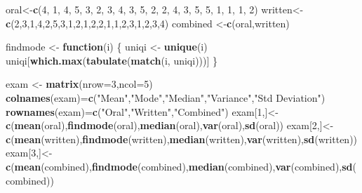\documentclass[]{article}
\newenvironment{Shaded}{\begin{snugshade}}{\end{snugshade}}
\newcommand{\KeywordTok}[1]{\textcolor[rgb]{0.13,0.29,0.53}{\textbf{#1}}}
\newcommand{\DataTypeTok}[1]{\textcolor[rgb]{0.13,0.29,0.53}{#1}}
\newcommand{\DecValTok}[1]{\textcolor[rgb]{0.00,0.00,0.81}{#1}}
\newcommand{\StringTok}[1]{\textcolor[rgb]{0.31,0.60,0.02}{#1}}
\newcommand{\ControlFlowTok}[1]{\textcolor[rgb]{0.13,0.29,0.53}{\textbf{#1}}}
\newcommand{\NormalTok}[1]{#1}
\begin{document}
\begin{Shaded}
\begin{Highlighting}[]
\NormalTok{oral<-}\KeywordTok{c}\NormalTok{(}\DecValTok{4}\NormalTok{, }\DecValTok{1}\NormalTok{, }\DecValTok{4}\NormalTok{, }\DecValTok{5}\NormalTok{, }\DecValTok{3}\NormalTok{, }\DecValTok{2}\NormalTok{, }\DecValTok{3}\NormalTok{, }\DecValTok{4}\NormalTok{, }\DecValTok{3}\NormalTok{, }\DecValTok{5}\NormalTok{, }\DecValTok{2}\NormalTok{, }\DecValTok{2}\NormalTok{, }\DecValTok{4}\NormalTok{, }\DecValTok{3}\NormalTok{, }\DecValTok{5}\NormalTok{, }\DecValTok{5}\NormalTok{, }\DecValTok{1}\NormalTok{, }\DecValTok{1}\NormalTok{, }\DecValTok{1}\NormalTok{, }\DecValTok{2}\NormalTok{)}
\NormalTok{written<-}\KeywordTok{c}\NormalTok{(}\DecValTok{2}\NormalTok{,}\DecValTok{3}\NormalTok{,}\DecValTok{1}\NormalTok{,}\DecValTok{4}\NormalTok{,}\DecValTok{2}\NormalTok{,}\DecValTok{5}\NormalTok{,}\DecValTok{3}\NormalTok{,}\DecValTok{1}\NormalTok{,}\DecValTok{2}\NormalTok{,}\DecValTok{1}\NormalTok{,}\DecValTok{2}\NormalTok{,}\DecValTok{2}\NormalTok{,}\DecValTok{1}\NormalTok{,}\DecValTok{1}\NormalTok{,}\DecValTok{2}\NormalTok{,}\DecValTok{3}\NormalTok{,}\DecValTok{1}\NormalTok{,}\DecValTok{2}\NormalTok{,}\DecValTok{3}\NormalTok{,}\DecValTok{4}\NormalTok{)}
\NormalTok{combined <-}\KeywordTok{c}\NormalTok{(oral,written)}

\NormalTok{findmode <-}\StringTok{ }\ControlFlowTok{function}\NormalTok{(i) \{}
\NormalTok{   uniqi <-}\StringTok{ }\KeywordTok{unique}\NormalTok{(i)}
\NormalTok{   uniqi[}\KeywordTok{which.max}\NormalTok{(}\KeywordTok{tabulate}\NormalTok{(}\KeywordTok{match}\NormalTok{(i, uniqi)))]}
\NormalTok{\}}

\NormalTok{exam <-}\StringTok{ }\KeywordTok{matrix}\NormalTok{(}\DataTypeTok{nrow=}\DecValTok{3}\NormalTok{,}\DataTypeTok{ncol=}\DecValTok{5}\NormalTok{)}
\KeywordTok{colnames}\NormalTok{(exam)=}\KeywordTok{c}\NormalTok{(}\StringTok{"Mean"}\NormalTok{,}\StringTok{"Mode"}\NormalTok{,}\StringTok{"Median"}\NormalTok{,}\StringTok{"Variance"}\NormalTok{,}\StringTok{"Std Deviation"}\NormalTok{)}
\KeywordTok{rownames}\NormalTok{(exam)=}\KeywordTok{c}\NormalTok{(}\StringTok{"Oral"}\NormalTok{,}\StringTok{"Written"}\NormalTok{,}\StringTok{"Combined"}\NormalTok{)}
\NormalTok{exam[}\DecValTok{1}\NormalTok{,]<-}\KeywordTok{c}\NormalTok{(}\KeywordTok{mean}\NormalTok{(oral),}\KeywordTok{findmode}\NormalTok{(oral),}\KeywordTok{median}\NormalTok{(oral),}\KeywordTok{var}\NormalTok{(oral),}\KeywordTok{sd}\NormalTok{(oral))}
\NormalTok{exam[}\DecValTok{2}\NormalTok{,]<-}\KeywordTok{c}\NormalTok{(}\KeywordTok{mean}\NormalTok{(written),}\KeywordTok{findmode}\NormalTok{(written),}\KeywordTok{median}\NormalTok{(written),}\KeywordTok{var}\NormalTok{(written),}\KeywordTok{sd}\NormalTok{(written))}
\NormalTok{exam[}\DecValTok{3}\NormalTok{,]<-}\KeywordTok{c}\NormalTok{(}\KeywordTok{mean}\NormalTok{(combined),}\KeywordTok{findmode}\NormalTok{(combined),}\KeywordTok{median}\NormalTok{(combined),}\KeywordTok{var}\NormalTok{(combined),}\KeywordTok{sd}\NormalTok{(combined))}
\end{Highlighting}
\end{Shaded}
\end{document}
